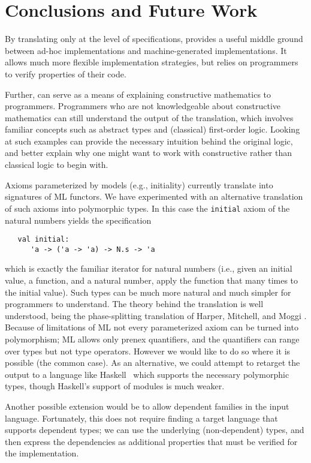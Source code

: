 \section{Conclusions and Future Work}
\label{sec:conclusion}

By translating only at the level of specifications, \RZ provides a
useful middle ground between ad-hoc implementations and
machine-generated implementations.  It allows much more flexible
implementation strategies, but relies on programmers to
verify properties of their code.

Further, \RZ can serve as a means of explaining constructive
mathematics to programmers.  Programmers who are not knowledgeable
about constructive mathematics can still understand the output of the
translation, which involves familiar concepts such as abstract types
and (classical) first-order logic.   Looking at such examples can
provide the necessary intuition behind the original logic, and better
explain why one might want to work with constructive rather than
classical logic to begin with.

\bigskip
 
Axioms parameterized by models (e.g., initiality) currently translate
into signatures of ML functors.  We have experimented with an
alternative translation of such axioms into polymorphic types.  In
this case the \Verb|initial| axiom of the natural numbers yields
the specification
\begin{Verbatim}
   val initial: 
      'a -> ('a -> 'a) -> N.s -> 'a
\end{Verbatim}
which is exactly the familiar iterator for natural numbers (i.e.,
given an initial value, a function, and a natural number, apply the
function that many times to the initial value).  Such types can be
much more natural and much simpler for programmers to understand.  The
theory behind the translation is well understood, being the
phase-splitting translation of Harper, Mitchell, and Moggi
\cite{harper+:popl90}.  Because of limitations of ML not every
parameterized axiom can be turned into polymorphism; ML allows only
prenex quantifiers, and the quantifiers can range over types but not
type operators.  However we would like to do so where it is possible
(the common case).  As an alternative, we could attempt to retarget
the output to a language like Haskell~\cite{haskell} which supports
the necessary polymorphic types, though Haskell's support of modules
is much weaker.

Another possible extension would be to allow dependent families in the
input language. Fortunately, this does not require finding a target
language that supports dependent types; we can use the underlying
(non-dependent) types, and then express the dependencies as additional
properties that must be verified for the implementation.


